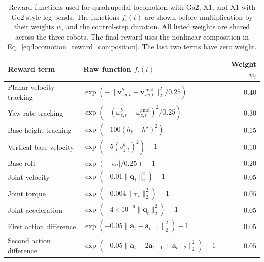 %
%

\begin{table}[t]
    \centering
    \small
    \setlength{\tabcolsep}{7pt}
    \renewcommand{\arraystretch}{1.22}
    \caption{Reward functions used for quadrupedal locomotion with Go2, X1, and X1 with Go2-style leg bends. The functions $f_i(t)$ are shown before multiplication by their weights $w_i$ and the control-step duration. All listed weights are shared across the three robots. The final reward uses the nonlinear composition in Eq.~\eqref{eq:locomotion_reward_composition}. The last two terms have zero weight.}
    \label{tab:locomotion_rewards}
    \begin{tabular}{@{}llr@{}}
        \toprule
        Reward term & Raw function $f_i(t)$ & Weight $w_i$ \\
        \midrule
        Planar velocity tracking & $\exp\!\left(-\|\mathbf v^b_{xy,t}-\mathbf v^{\mathrm{cmd}}_{xy,t}\|_2^2/0.25\right)$ & $0.40$ \\
        Yaw-rate tracking & $\exp\!\left(-(\omega^b_{z,t}-\omega^{\mathrm{cmd}}_{z,t})^2/0.25\right)$ & $0.30$ \\
        Base-height tracking & $\exp\!\left(-100(h_t-h^\star)^2\right)$ & $0.15$ \\
        \midrule
        Vertical base velocity & $\exp\!\left(-5(v^b_{z,t})^2\right)-1$ & $0.10$ \\
        Base roll & $\exp\!\left(-|\alpha_t|/0.25\right)-1$ & $0.20$ \\
        Joint velocity & $\exp\!\left(-0.01\|\dot{\mathbf q}_t\|_2^2\right)-1$ & $0.05$ \\
        Joint torque & $\exp\!\left(-0.004\|\boldsymbol\tau_t\|_2^2\right)-1$ & $0.05$ \\
        Joint acceleration & $\exp\!\left(-4\times10^{-6}\|\ddot{\mathbf q}_t\|_2^2\right)-1$ & $0.05$ \\
        First action difference & $\exp\!\left(-0.05\|\mathbf a_t-\mathbf a_{t-1}\|_2^2\right)-1$ & $0.05$ \\
        Second action difference & $\exp\!\left(-0.05\|\mathbf a_t-2\mathbf a_{t-1}+\mathbf a_{t-2}\|_2^2\right)-1$ & $0.05$ \\

\end{tabular}
\end{table}
